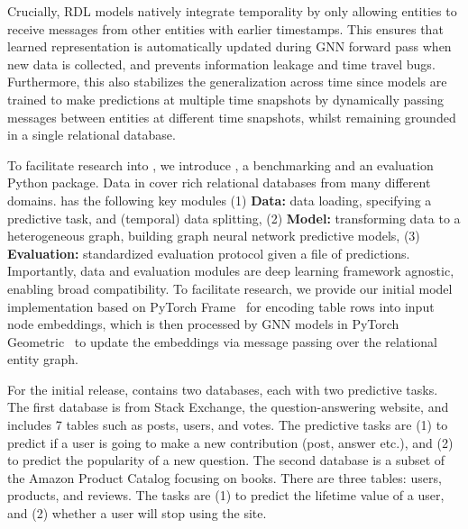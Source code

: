  Crucially, RDL models natively integrate temporality by only allowing entities to receive messages from other entities with earlier timestamps. This ensures that learned representation is automatically updated during GNN forward pass when new data is collected, and prevents information leakage and time travel bugs. Furthermore, this also stabilizes the generalization across time since models are trained to make predictions at multiple time snapshots by dynamically passing messages between entities at different time snapshots, whilst remaining grounded in a single relational database. 


\xhdr{\BenchmarkName} To facilitate research into \AreaName, we introduce {\em \BenchmarkName}, a benchmarking and an evaluation Python package. Data in \BenchmarkName cover rich relational databases from many different domains. \BenchmarkName has the following key modules (1) \textbf{Data:} data loading, specifying a predictive task, and (temporal) data splitting, (2) \textbf{Model:} transforming data to a heterogeneous graph, building graph neural network predictive models,  (3) \textbf{Evaluation:} standardized evaluation protocol given a file of predictions. Importantly, data and evaluation modules are deep learning framework agnostic, enabling broad compatibility. To facilitate research, we provide our initial model implementation based on PyTorch Frame~\citep{Hu_PyTorch_Frame_A_2023} for encoding table rows into input node embeddings, which is then processed by GNN models in PyTorch Geometric~\citep{fey2019fast} to update the embeddings via message passing over the relational entity graph.

For the initial release, \BenchmarkName contains two databases, each with two predictive tasks. The first database is from Stack Exchange, the question-answering website, and includes 7 tables such as posts, users, and votes. The predictive tasks are (1) to predict if a user is going to make a new contribution (post, answer etc.), and (2) to predict the popularity of a new question. The second database is a subset of the Amazon Product Catalog focusing on books. There are three tables: users, products, and reviews. The tasks are (1) to predict the lifetime value of a user, and (2) whether a user will stop using the site. 

